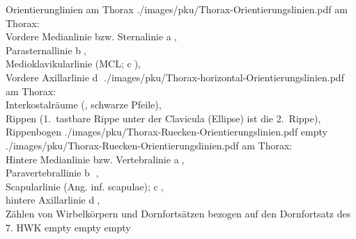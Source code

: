 \begin{PictureSeriesWide}{}{Orientierunglinien am Thorax}
{./images/pku/Thorax-Orientierungslinien.pdf}
{ am
Thorax: 
\\
Vordere Medianlinie bzw. Sternalinie
{\sffamily\textcircled{\scriptsize a}},
\\
Parasternallinie {\sffamily\textcircled{\scriptsize b}},
\\
Medioklavikularlinie (MCL;
{\sffamily\textcircled{\scriptsize c}}),
\\
Vordere Axillarlinie {\sffamily\textcircled{\scriptsize d}}}
{./images/pku/Thorax-horizontal-Orientierungslinien.pdf}
{ am
Thorax:
\\
Interkostalräume (, schwarze Pfeile),
\\
Rippen (1.~tastbare Rippe unter der Clavicula (Ellipse)
ist die 2.~Rippe),
\\
Rippenbogen
}
{./images/pku/Thorax-Ruecken-Orientierungslinien.pdf}
{}
{empty}
{}
{./images/pku/Thorax-Ruecken-Orientierungslinien.pdf}
{ am
Thorax: 
\\
Hintere Medianlinie bzw. Vertebralinie
{\sffamily\textcircled{\scriptsize a}},
\\
Paravertebrallinie {\sffamily\textcircled{\scriptsize b}} , 
\\
Scapularlinie (Ang.
inf. scapulae); {\sffamily\textcircled{\scriptsize c}},
\\
hintere Axillarlinie {\sffamily\textcircled{\scriptsize d}},
\\
Zählen von Wirbelkörpern und Dornfortsätzen bezogen auf den
Dornfortsatz des 7. HWK}
{empty}
{}
{empty}
{}
{empty}
{}
\end{PictureSeriesWide}






